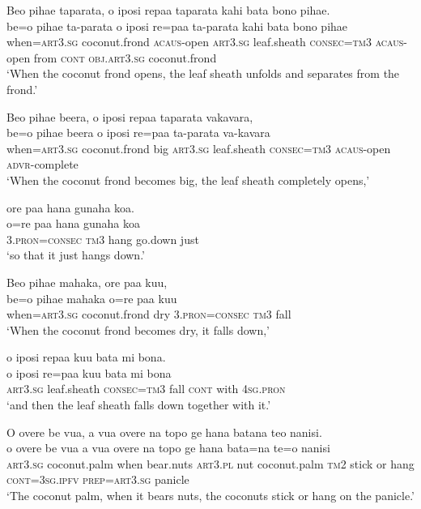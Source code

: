 \ea\label{ex:text01-26}
Beo pihae taparata, o iposi repaa taparata kahi bata bono pihae.\\
\gll be=o	pihae	ta-parata	o	iposi	re=paa	ta-parata	kahi	bata	bono	pihae\\
     when=\textsc{art}3.\textsc{sg}	coconut.frond	\textsc{acaus}-open	\textsc{art}3.\textsc{sg}	leaf.sheath	\textsc{consec}=\textsc{tm}3	\textsc{acaus}-open	from	\textsc{cont}	\textsc{obj}.\textsc{art}3.\textsc{sg}	coconut.frond\\
\glt `When the coconut frond opens, the leaf sheath unfolds and separates from the frond.'
\z

\ea\label{ex:text01-27}
Beo pihae beera, o iposi repaa taparata vakavara,\\
\gll be=o	pihae	beera	o	iposi	re=paa	ta-parata	va-kavara\\
     when=\textsc{art}3.\textsc{sg}	coconut.frond	big	\textsc{art}3.\textsc{sg}	leaf.sheath	\textsc{consec}=\textsc{tm}3	\textsc{acaus}-open	\textsc{advr}-complete\\
\glt `When the coconut frond becomes big, the leaf sheath completely opens,'
\z

\ea\label{ex:text01-28}
ore paa hana gunaha koa.\\
\gll o=re	paa	hana	gunaha	koa\\
     3.\textsc{pron}=\textsc{consec}	\textsc{tm}3	hang	go.down	just\\
\glt `so that it just hangs down.'
\z

\ea\label{ex:text01-29}
Beo pihae mahaka, ore paa kuu,\\
\gll be=o	pihae	mahaka	o=re	paa	kuu\\
     when=\textsc{art}3.\textsc{sg}	coconut.frond	dry	3.\textsc{pron}=\textsc{consec}	\textsc{tm}3	fall\\
\glt `When the coconut frond becomes dry, it falls down,'
\z

\newpage
\ea\label{ex:text01-30}
o iposi repaa kuu bata mi bona.\\
\gll o	iposi	re=paa	kuu	bata	mi	bona\\
     \textsc{art}3.\textsc{sg}	leaf.sheath	\textsc{consec}=\textsc{tm}3	fall	\textsc{cont}	with	4\textsc{sg}.\textsc{pron}\\
\glt `and then the leaf sheath falls down together with it.'
\z

\ea\label{ex:text01-31}
O overe be vua, a vua overe na topo ge hana batana teo nanisi.\\
\gll o	overe	be	vua	a	vua	overe	na	topo	ge	hana	bata=na	te=o	nanisi\\
     \textsc{art}3.\textsc{sg}	coconut.palm	when	bear.nuts	\textsc{art}3.\textsc{pl}	nut	coconut.palm	\textsc{tm}2	stick	or	hang	\textsc{cont}=3\textsc{sg}.\textsc{ipfv}	\textsc{prep}=\textsc{art}3.\textsc{sg}	panicle\\
\glt `The coconut palm, when it bears nuts, the coconuts stick or hang on the panicle.'
\z

